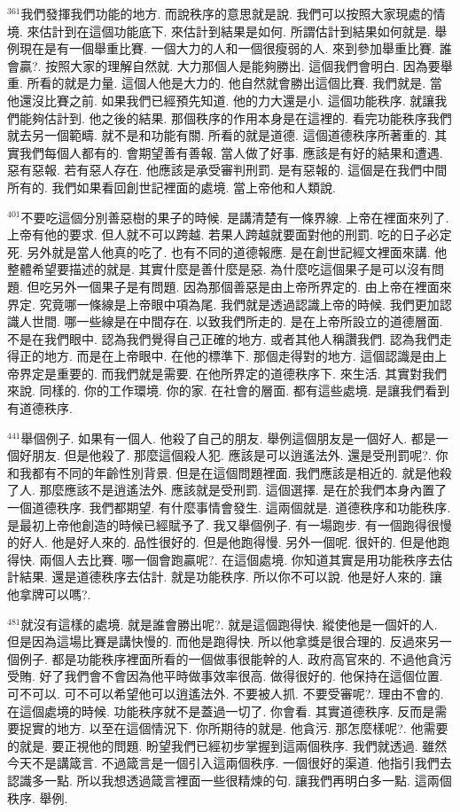 \documentclass{book}
\begin{document}
$^{361}$我們發揮我們功能的地方.
而說秩序的意思就是說.
我們可以按照大家現處的情境.
來估計到在這個功能底下.
來估計到結果是如何.
所謂估計到結果如何就是.
舉例現在是有一個舉重比賽.
一個大力的人和一個很瘦弱的人.
來到參加舉重比賽.
誰會贏?.
按照大家的理解自然就.
大力那個人是能夠勝出.
這個我們會明白.
因為要舉重.
所看的就是力量.
這個人他是大力的.
他自然就會勝出這個比賽.
我們就是.
當他還沒比賽之前.
如果我們已經預先知道.
他的力大還是小.
這個功能秩序.
就讓我們能夠估計到.
他之後的結果.
那個秩序的作用本身是在這裡的.
看完功能秩序我們就去另一個範疇.
就不是和功能有關.
所看的就是道德.
這個道德秩序所著重的.
其實我們每個人都有的.
會期望善有善報.
當人做了好事.
應該是有好的結果和遭遇.
惡有惡報.
若有惡人存在.
他應該是承受審判刑罰.
是有惡報的.
這個是在我們中間所有的.
我們如果看回創世記裡面的處境.
當上帝他和人類說.

$^{401}$不要吃這個分別善惡樹的果子的時候.
是講清楚有一條界線.
上帝在裡面來列了.
上帝有他的要求.
但人就不可以跨越.
若果人跨越就要面對他的刑罰.
吃的日子必定死.
另外就是當人他真的吃了.
也有不同的道德報應.
是在創世記經文裡面來講.
他整體希望要描述的就是.
其實什麼是善什麼是惡.
為什麼吃這個果子是可以沒有問題.
但吃另外一個果子是有問題.
因為那個善惡是由上帝所界定的.
由上帝在裡面來界定.
究竟哪一條線是上帝眼中項為尾.
我們就是透過認識上帝的時候.
我們更加認識人世間.
哪一些線是在中間存在.
以致我們所走的.
是在上帝所設立的道德層面.
不是在我們眼中.
認為我們覺得自己正確的地方.
或者其他人稱讚我們.
認為我們走得正的地方.
而是在上帝眼中.
在他的標準下.
那個走得對的地方.
這個認識是由上帝界定是重要的.
而我們就是需要.
在他所界定的道德秩序下.
來生活.
其實對我們來說.
同樣的.
你的工作環境.
你的家.
在社會的層面.
都有這些處境.
是讓我們看到有道德秩序.

$^{441}$舉個例子.
如果有一個人.
他殺了自己的朋友.
舉例這個朋友是一個好人.
都是一個好朋友.
但是他殺了.
那麼這個殺人犯.
應該是可以逍遙法外.
還是受刑罰呢?.
你和我都有不同的年齡性別背景.
但是在這個問題裡面.
我們應該是相近的.
就是他殺了人.
那麼應該不是逍遙法外.
應該就是受刑罰.
這個選擇.
是在於我們本身內置了一個道德秩序.
我們都期望.
有什麼事情會發生.
這兩個就是.
道德秩序和功能秩序.
是最初上帝他創造的時候已經賦予了.
我又舉個例子.
有一場跑步.
有一個跑得很慢的好人.
他是好人來的.
品性很好的.
但是他跑得慢.
另外一個呢.
很奸的.
但是他跑得快.
兩個人去比賽.
哪一個會跑贏呢?.
在這個處境.
你知道其實是用功能秩序去估計結果.
還是道德秩序去估計.
就是功能秩序.
所以你不可以說.
他是好人來的.
讓他拿牌可以嗎?.

$^{481}$就沒有這樣的處境.
就是誰會勝出呢?.
就是這個跑得快.
縱使他是一個奸的人.
但是因為這場比賽是講快慢的.
而他是跑得快.
所以他拿獎是很合理的.
反過來另一個例子.
都是功能秩序裡面所看的一個做事很能幹的人.
政府高官來的.
不過他貪污受賄.
好了我們會不會因為他平時做事效率很高.
做得很好的.
他保持在這個位置.
可不可以.
可不可以希望他可以逍遙法外.
不要被人抓.
不要受審呢?.
理由不會的.
在這個處境的時候.
功能秩序就不是蓋過一切了.
你會看.
其實道德秩序.
反而是需要捉實的地方.
以至在這個情況下.
你所期待的就是.
他貪污.
那怎麼樣呢?.
他需要的就是.
要正視他的問題.
盼望我們已經初步掌握到這兩個秩序.
我們就透過.
雖然今天不是講箴言.
不過箴言是一個引入這兩個秩序.
一個很好的渠道.
他指引我們去認識多一點.
所以我想透過箴言裡面一些很精煉的句.
讓我們再明白多一點.
這兩個秩序.
舉例.
\end{document}
